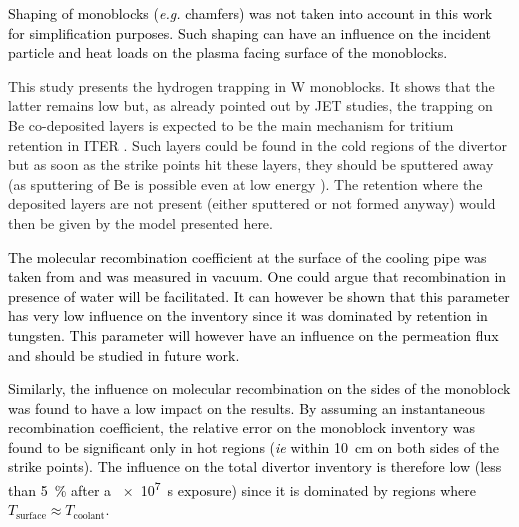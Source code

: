\textcolor{black}{
Shaping of monoblocks (\textit{e.g.} chamfers) was not taken into account in this work for simplification purposes.
Such shaping can have an influence on the incident particle and heat loads on the plasma facing surface of the monoblocks.
}


This study presents the hydrogen trapping in W monoblocks.
It shows that the latter remains low but, as already pointed out by JET studies, the trapping on Be co-deposited layers is expected to be the main mechanism for tritium retention in ITER \cite{brezinsek_beryllium_2015, heinola_fuel_2015}.
Such layers could be found in the cold regions of the divertor but as soon as the strike points hit these layers, they should be sputtered away (as sputtering of Be is possible even at low energy \cite{bjorkas_variables_2013, brezinsek_beryllium_2015}).
The retention where the deposited layers are not present (either sputtered or not formed anyway) would then be given by the model presented here.

\textcolor{black}{
The molecular recombination coefficient at the surface of the cooling pipe was taken from \cite{anderl_deuterium_1999} and was measured in vacuum.
One could argue that recombination in presence of water will be facilitated.
It can however be shown that this parameter has very low influence on the inventory since it was dominated by retention in tungsten.
This parameter will however have an influence on the permeation flux and should be studied in future work.}

\textcolor{black}{Similarly, the influence on molecular recombination on the sides of the monoblock was found to have a low impact on the results.
By assuming an instantaneous recombination coefficient, the relative error on the monoblock inventory was found to be significant only in hot regions (\textit{ie} within \SI{10}{cm} on both sides of the strike points).
The influence on the total divertor inventory is therefore low (less than \SI{5}{\%} after a \SI{e7}{s} exposure) since it is dominated by regions where $T_\mathrm{surface} \approx T_\mathrm{coolant}$.}

